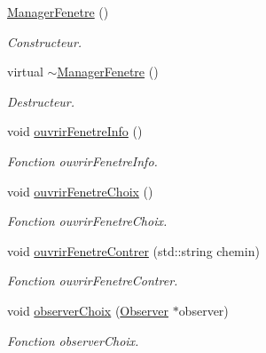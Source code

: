 \begin{DoxyCompactItemize}
\item 
\hypertarget{classManagerFenetre_adde6ceef42d5ed5000cb9dbc76ef1442}{\hyperlink{classManagerFenetre_adde6ceef42d5ed5000cb9dbc76ef1442}{\-Manager\-Fenetre} ()}\label{classManagerFenetre_adde6ceef42d5ed5000cb9dbc76ef1442}

\begin{DoxyCompactList}\small\item\em \-Constructeur. \end{DoxyCompactList}\item 
\hypertarget{classManagerFenetre_a17257657b182d8d8c9bc001684d388e4}{virtual \hyperlink{classManagerFenetre_a17257657b182d8d8c9bc001684d388e4}{$\sim$\-Manager\-Fenetre} ()}\label{classManagerFenetre_a17257657b182d8d8c9bc001684d388e4}

\begin{DoxyCompactList}\small\item\em \-Destructeur. \end{DoxyCompactList}\item 
\hypertarget{classManagerFenetre_a946bf5d3b2fba1cdca3713a0d850c0c2}{void \hyperlink{classManagerFenetre_a946bf5d3b2fba1cdca3713a0d850c0c2}{ouvrir\-Fenetre\-Info} ()}\label{classManagerFenetre_a946bf5d3b2fba1cdca3713a0d850c0c2}

\begin{DoxyCompactList}\small\item\em \-Fonction ouvrir\-Fenetre\-Info. \end{DoxyCompactList}\item 
\hypertarget{classManagerFenetre_a28623b59c8cca914ba1c91a8b17999ff}{void \hyperlink{classManagerFenetre_a28623b59c8cca914ba1c91a8b17999ff}{ouvrir\-Fenetre\-Choix} ()}\label{classManagerFenetre_a28623b59c8cca914ba1c91a8b17999ff}

\begin{DoxyCompactList}\small\item\em \-Fonction ouvrir\-Fenetre\-Choix. \end{DoxyCompactList}\item 
\hypertarget{classManagerFenetre_a180deb18bd2f3754d1f0e85eeeab414f}{void \hyperlink{classManagerFenetre_a180deb18bd2f3754d1f0e85eeeab414f}{ouvrir\-Fenetre\-Contrer} (std\-::string chemin)}\label{classManagerFenetre_a180deb18bd2f3754d1f0e85eeeab414f}

\begin{DoxyCompactList}\small\item\em \-Fonction ouvrir\-Fenetre\-Contrer. \end{DoxyCompactList}\item 
\hypertarget{classManagerFenetre_a400a128ee4377b13c4e680e6eba18921}{void \hyperlink{classManagerFenetre_a400a128ee4377b13c4e680e6eba18921}{observer\-Choix} (\hyperlink{classObserver}{\-Observer} $\ast$observer)}\label{classManagerFenetre_a400a128ee4377b13c4e680e6eba18921}

\begin{DoxyCompactList}\small\item\em \-Fonction observer\-Choix. \end{DoxyCompactList}\end{DoxyCompactItemize}


